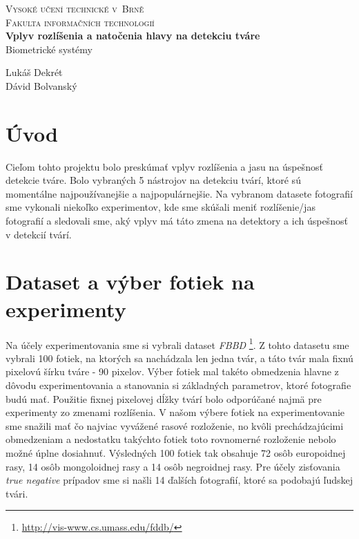 \documentclass[]{article}
\begin{document}
	
	\begin{titlepage}
		\begin{center}
			\textsc{{\LARGE Vysoké učení technické v~Brně\\[0.3em]
					Fakulta informačních technologií}}\\
			{\Huge \textbf{Vplyv rozlíšenia a natočenia hlavy na detekciu tváre}\\[0.5em]}
			\Large{Biometrické systémy}
		\end{center}
		
		{\noindent \large Lukáš Dekrét\\Dávid Bolvanský}
	\end{titlepage}
	
	\section{Úvod}
	Cieľom tohto projektu bolo preskúmať vplyv rozlíšenia a jasu na úspešnosť detekcie tváre. Bolo vybraných 5 nástrojov na detekciu tvárí, ktoré sú momentálne najpoužívanejšie a najpopulárnejšie. Na vybranom datasete fotografií sme vykonali niekoľko experimentov, kde sme skúšali meniť rozlíšenie/jas fotografií a sledovali sme, aký vplyv má táto zmena na detektory a ich úspešnosť v detekcií tvárí.
	
	\section{Dataset a výber fotiek na experimenty}
	Na účely experimentovania sme si vybrali dataset \textit{FBBD} \footnote{\url{http://vis-www.cs.umass.edu/fddb/}}. Z tohto datasetu sme vybrali 100 fotiek, na ktorých sa nachádzala len jedna tvár, a táto tvár mala fixnú pixelovú šírku tváre \-- 90 pixelov. Výber fotiek mal takéto obmedzenia hlavne z dôvodu experimentovania a stanovania si základných parametrov, ktoré fotografie budú mať. Použitie fixnej pixelovej dĺžky tvárí bolo odporúčané najmä pre experimenty zo zmenami rozlíšenia.
	V našom výbere fotiek na experimentovanie sme snažili mať čo najviac vyvážené rasové rozloženie, no kvôli prechádzajúcimi obmedzeniam a nedostatku takýchto fotiek toto rovnomerné rozloženie nebolo možné úplne dosiahnuť. Výsledných 100 fotiek tak obsahuje 72 osôb europoidnej rasy, 14 osôb mongoloidnej rasy a 14 osôb negroidnej rasy. Pre účely zisťovania \textit{true negative} prípadov sme si našli 14 ďalších fotografií, ktoré sa podobajú ľudskej tvári.
	
\end{document}
